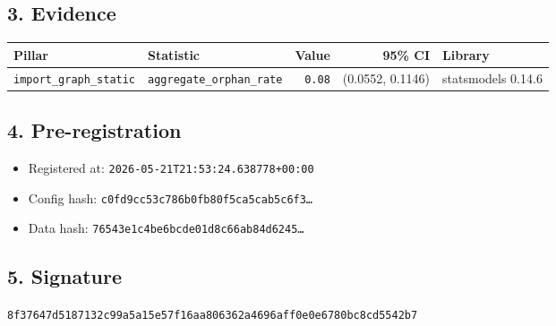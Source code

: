 \documentclass{article}
\begin{document}
\subsection*{3. Evidence}
\begin{tabular}{llrrl}\toprule
\textbf{Pillar} & \textbf{Statistic} & \textbf{Value} & \textbf{95\% CI} & \textbf{Library} \\\midrule
\texttt{import\_graph\_static} & \texttt{aggregate\_orphan\_rate} & \texttt{0.08} & (0.0552, 0.1146) & statsmodels 0.14.6 \\
\bottomrule\end{tabular}
\subsection*{4. Pre-registration}
\begin{itemize}
\item Registered at: \texttt{2026-05-21T21:53:24.638778+00:00}
\item Config hash: \texttt{c0fd9cc53c786b0fb80f5ca5cab5c6f3\dots}
\item Data hash: \texttt{76543e1c4be6bcde01d8c66ab84d6245\dots}
\end{itemize}
\subsection*{5. Signature}
\texttt{8f37647d5187132c99a5a15e57f16aa806362a4696aff0e0e6780bc8cd5542b7}\\
\end{document}
